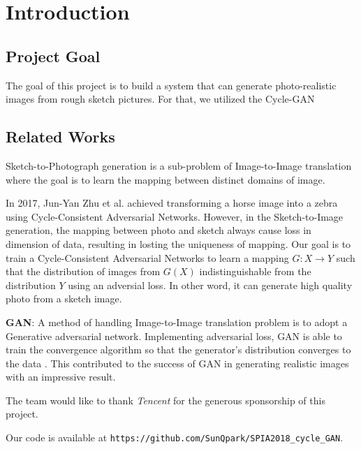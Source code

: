 \chapter{Introduction}\label{Ch:Introduction}

\section{Project Goal}

The goal of this project is to build a system that can generate photo-realistic images from rough sketch pictures. For that, we utilized the Cycle-GAN~\cite{CycleGAN} 

\section{Related Works}

Sketch-to-Photograph generation is a sub-problem of Image-to-Image translation where the goal is to learn the mapping between distinct domains of image. 

In 2017, Jun-Yan Zhu et al. achieved transforming a horse image into a zebra using Cycle-Consistent Adversarial Networks. However, in the Sketch-to-Image generation, the mapping between photo and sketch always cause loss in dimension of data, resulting in losting the uniqueness of mapping. Our goal is to train a Cycle-Consistent Adversarial Networks to learn a mapping \(G:X \rightarrow Y\) such that the distribution of images from \(G(X)\) indistinguishable from the distribution \(Y\) using an adversial loss. In other word, it can generate high quality photo from a sketch image.%

\textbf{GAN}: A method of handling Image-to-Image translation problem is to adopt a Generative adversarial network. Implementing adversarial loss, GAN is able to train the convergence algorithm so that the generator's distribution converges to the data\cite{GANs0} . This contributed to the success of GAN in generating realistic images with an impressive result.



The team would like to thank \emph{Tencent} for the generous sponsorship of this project. 




Our code is available at \texttt{https://github.com/SunQpark/SPIA2018\_cycle\_GAN}.




\endinput
